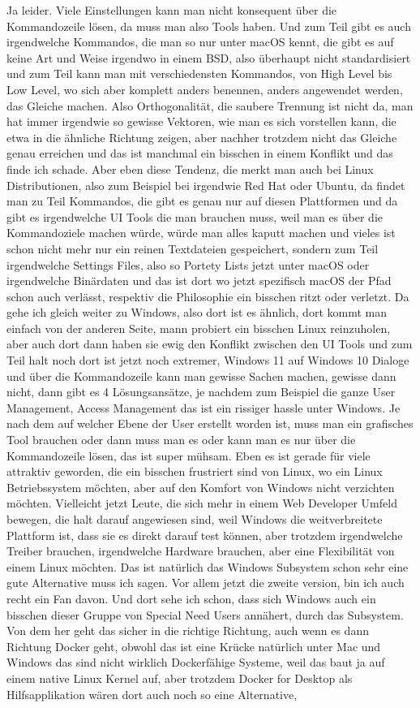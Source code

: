 \begin{description}
\NH Ja leider. Viele Einstellungen kann man nicht konsequent über die Kommandozeile lösen, da muss man also Tools haben. Und zum Teil gibt es auch irgendwelche Kommandos, die man so nur unter macOS kennt, die gibt es auf keine Art und Weise irgendwo in einem BSD, also überhaupt nicht standardisiert und zum Teil kann man mit verschiedensten Kommandos, von High Level bis Low Level, wo sich aber komplett anders benennen, anders angewendet werden, das Gleiche machen. Also Orthogonalität, die saubere Trennung ist nicht da, man hat immer irgendwie so gewisse Vektoren, wie man es sich vorstellen kann, die etwa in die ähnliche Richtung zeigen, aber nachher trotzdem nicht das Gleiche genau erreichen und das ist manchmal ein bisschen in einem Konflikt und das finde ich schade. Aber eben diese Tendenz, die merkt man auch bei Linux Distributionen, also zum Beispiel bei irgendwie Red Hat oder Ubuntu, da findet man zu Teil Kommandos, die gibt es genau nur auf diesen Plattformen und da gibt es irgendwelche UI Tools die man brauchen muss, weil man es über die Kommandoziele machen würde, würde man alles kaputt machen und vieles ist schon nicht mehr nur ein reinen Textdateien gespeichert, sondern zum Teil irgendwelche Settings Files, also so Portety Lists jetzt unter macOS oder irgendwelche Binärdaten und das ist dort wo jetzt spezifisch macOS der Pfad schon auch verlässt, respektiv die Philosophie ein bisschen ritzt oder verletzt. Da gehe ich gleich weiter zu Windows, also dort ist es ähnlich, dort kommt man einfach von der anderen Seite, mann probiert ein bisschen Linux reinzuholen, aber auch dort dann haben sie ewig den Konflikt zwischen den UI Tools und zum Teil halt noch dort ist jetzt noch extremer, Windows 11 auf Windows 10 Dialoge und über die Kommandozeile kann man gewisse Sachen machen, gewisse dann nicht, dann gibt es 4 Lösungsansätze, je nachdem zum Beispiel die ganze User Management, Access Management das ist ein rissiger hassle unter Windows. Je nach dem auf welcher Ebene der User erstellt worden ist, muss man ein grafisches Tool brauchen oder dann muss man es oder kann man es nur über die Kommandozeile lösen, das ist super mühsam. Eben es ist gerade für viele attraktiv geworden, die ein bisschen frustriert sind von Linux, wo ein Linux Betriebssystem möchten, aber auf den Komfort von Windows nicht verzichten möchten. Vielleicht jetzt Leute, die sich mehr in einem Web Developer Umfeld bewegen, die halt darauf angewiesen sind, weil Windows die weitverbreitete Plattform ist, dass sie es direkt darauf test können, aber trotzdem irgendwelche Treiber brauchen, irgendwelche Hardware brauchen, aber eine Flexibilität von einem Linux möchten. Das ist natürlich das Windows Subsystem schon sehr eine gute Alternative muss ich sagen. Vor allem jetzt die zweite version, bin ich auch recht ein Fan davon. Und dort sehe ich schon, dass sich Windows auch ein bisschen dieser Gruppe von Special Need Users annähert, durch das Subsystem. Von dem her geht das sicher in die richtige Richtung, auch wenn es dann Richtung Docker geht, obwohl das ist eine Krücke natürlich unter Mac und Windows das sind nicht wirklich Dockerfähige Systeme, weil das baut ja auf einem native Linux Kernel auf, aber trotzdem Docker for Desktop als Hilfsapplikation wären dort auch noch so eine Alternative, 
\end{description}
